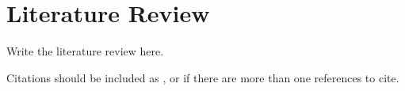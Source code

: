 
\chapter{Literature Review}\label{chapter:Literature Review}
\indent Write the literature review here.

\indent Citations should be included as \cite{Chen}, or \cite{Kondoz,atal} if there are more than one references to cite.

\indent 
